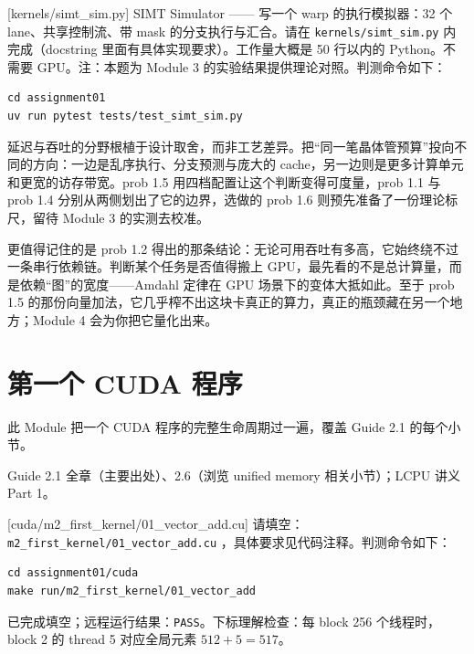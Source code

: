 \documentclass[11pt,a4paper,fontset=none]{ctexart}
\begin{document}
[kernels/simt\_sim.py]
SIMT Simulator —— 写一个 warp 的执行模拟器：32 个 lane、共享控制流、带 mask 的分支执行与汇合。请在 \texttt{kernels/simt\_sim.py} 内完成（docstring 里面有具体实现要求）。工作量大概是 50 行以内的 Python。不需要 GPU。注：本题为 Module 3 的实验结果提供理论对照。判测命令如下：

\begin{lstlisting}
cd assignment01
uv run pytest tests/test_simt_sim.py
\end{lstlisting}

\begin{lookback}
延迟与吞吐的分野根植于设计取舍，而非工艺差异。把“同一笔晶体管预算”投向不同的方向：一边是乱序执行、分支预测与庞大的 cache，另一边则是更多计算单元和更宽的访存带宽。prob 1.5 用四档配置让这个判断变得可度量，prob 1.1 与 prob 1.4 分别从两侧划出了它的边界，选做的 prob 1.6 则预先准备了一份理论标尺，留待 Module 3 的实测去校准。

更值得记住的是 prob 1.2 得出的那条结论：无论可用吞吐有多高，它始终绕不过一条串行依赖链。判断某个任务是否值得搬上 GPU，最先看的不是总计算量，而是依赖“图”的宽度——Amdahl 定律在 GPU 场景下的变体大抵如此。至于 prob 1.5 的那份向量加法，它几乎榨不出这块卡真正的算力，真正的瓶颈藏在另一个地方；Module 4 会为你把它量化出来。
\end{lookback}

\section{第一个 CUDA 程序}

此 Module 把一个 CUDA 程序的完整生命周期过一遍，覆盖 Guide 2.1 的每个小节。

\begin{reading}
Guide 2.1 全章（主要出处）、2.6（浏览 unified memory 相关小节）；LCPU 讲义 Part 1。
\end{reading}

[cuda/m2\_first\_kernel/01\_vector\_add.cu]
请填空：\texttt{m2\_first\_kernel/01\_vector\_add.cu} ，具体要求见代码注释。判测命令如下：

\begin{lstlisting}
cd assignment01/cuda
make run/m2_first_kernel/01_vector_add
\end{lstlisting}

\begin{tcolorbox}[title={2.1 判测记录}]
已完成填空；远程运行结果：\texttt{PASS}。下标理解检查：每 block 256 个线程时，block 2 的 thread 5 对应全局元素 $512+5=517$。
\end{tcolorbox}
\end{document}
